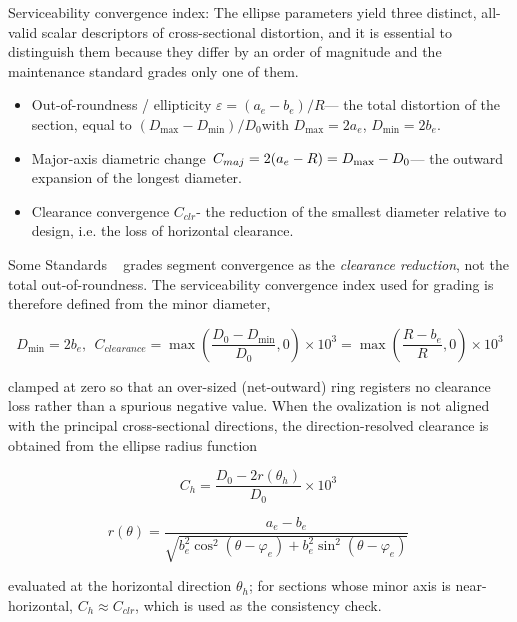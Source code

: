 \documentclass[preprint,12pt,authoryear]{elsarticle}
\begin{document}
Serviceability convergence index: The ellipse parameters yield three
distinct, all-valid scalar descriptors of cross-sectional distortion,
and it is essential to distinguish them because they differ by an order
of magnitude and the maintenance standard grades only one of them.

\begin{itemize}
\item
  Out-of-roundness / ellipticity \(\varepsilon = (a_{e} - b_{e})/R\)---
  the total distortion of the section, equal to
  \((D_{\max} - D_{\min})/D_{0}\)with \(D_{\max} = 2a_{e}\),
  \(D_{\min} = 2b_{e}\).
\item
  Major-axis diametric change
  \(\text{\,}C_{maj} = 2(a_{e} - R) = D_{\max} - D_{0}\)--- the outward
  expansion of the longest diameter.
\item
  Clearance convergence \(C_{clr}\)- the reduction of the smallest
  diameter relative to design, i.e. the loss of horizontal clearance.
\end{itemize}

Some Standards ~\citep{MOHURD2018} grades segment convergence as the
\emph{clearance reduction}, not the total out-of-roundness. The
serviceability convergence index used for grading is therefore defined
from the minor diameter,

\[D_{\min} = 2b_{e},\ \ C_{clearance} = \max{\left( \frac{D_{0} - D_{\min}}{D_{0}},0 \right) \times 10^{3}} = \max{\left( \frac{R - b_{e}}{R},0 \right) \times 10^{3}}\]

clamped at zero so that an over-sized (net-outward) ring registers no
clearance loss rather than a spurious negative value. When the
ovalization is not aligned with the principal cross-sectional
directions, the direction-resolved clearance is obtained from the
ellipse radius function

\begin{equation}
  C_{h} = \frac{D_{0} - 2r\left( \theta_{h} \right)}{D_{0}} \times 10^{3}\
  \label{eq:24}
\end{equation}

\begin{equation}
  r(\theta) = \frac{a_{e} - b_{e}}{\sqrt{b_{e}^{2}\cos^{2}\left( \theta - \varphi_{e} \right) + b_{e}^{2}\sin^{2}\left( \theta - \varphi_{e} \right)}}\
  \label{eq:25}
\end{equation}

evaluated at the horizontal direction \(\theta_{h}\); for sections whose
minor axis is near-horizontal, \(C_{h} \approx C_{clr}\), which is used
as the consistency check.
\end{document}
